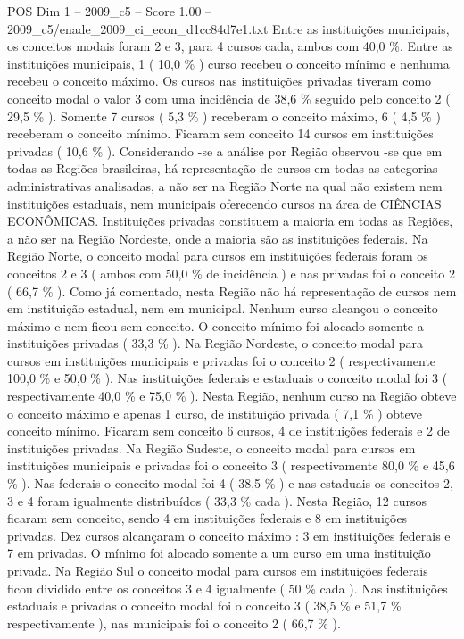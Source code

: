 \begin{textsample}{POS Dim 1 – 2009\_c5 – Score 1.00 – 2009\_c5/enade\_2009\_ci\_econ\_d1cc84d7e1.txt}
Entre as instituições municipais, os conceitos modais foram 2 e 3, para 4 cursos cada, ambos com 40,0 \%.
Entre as instituições municipais, 1 ( 10,0 \% ) curso recebeu o conceito mínimo e nenhuma recebeu o conceito máximo.
Os cursos nas instituições privadas tiveram como conceito modal o valor 3 com uma incidência de 38,6 \% seguido pelo conceito 2 ( 29,5 \% ).
Somente 7 cursos ( 5,3 \% ) receberam o conceito máximo, 6 ( 4,5 \% ) receberam o conceito mínimo.
Ficaram sem conceito 14 cursos em instituições privadas ( 10,6 \% ).
Considerando -se a análise por Região observou -se que em todas as Regiões brasileiras, há representação de cursos em todas as categorias administrativas analisadas, a não ser na Região Norte na qual não existem nem instituições estaduais, nem municipais oferecendo cursos na área de CIÊNCIAS ECONÔMICAS.
Instituições privadas constituem a maioria em todas as Regiões, a não ser na Região Nordeste, onde a maioria são as instituições federais.
Na Região Norte, o conceito modal para cursos em instituições federais foram os conceitos 2 e 3 ( ambos com 50,0 \% de incidência ) e nas privadas foi o conceito 2 ( 66,7 \% ).
Como já comentado, nesta Região não há representação de cursos nem em instituição estadual, nem em municipal.
Nenhum curso alcançou o conceito máximo e nem ficou sem conceito.
O conceito mínimo foi alocado somente a instituições privadas ( 33,3 \% ).
Na Região Nordeste, o conceito modal para cursos em instituições municipais e privadas foi o conceito 2 ( respectivamente 100,0 \% e 50,0 \% ).
Nas instituições federais e estaduais o conceito modal foi 3 ( respectivamente 40,0 \% e 75,0 \% ).
Nesta Região, nenhum curso na Região obteve o conceito máximo e apenas 1 curso, de instituição privada ( 7,1 \% ) obteve conceito mínimo.
Ficaram sem conceito 6 cursos, 4 de instituições federais e 2 de instituições privadas.
Na Região Sudeste, o conceito modal para cursos em instituições municipais e privadas foi o conceito 3 ( respectivamente 80,0 \% e 45,6 \% ).
Nas federais o conceito modal foi 4 ( 38,5 \% ) e nas estaduais os conceitos 2, 3 e 4 foram igualmente distribuídos ( 33,3 \% cada ).
Nesta Região, 12 cursos ficaram sem conceito, sendo 4 em instituições federais e 8 em instituições privadas.
Dez cursos alcançaram o conceito máximo : 3 em instituições federais e 7 em privadas.
O mínimo foi alocado somente a um curso em uma instituição privada.
Na Região Sul o conceito modal para cursos em instituições federais ficou dividido entre os conceitos 3 e 4 igualmente ( 50 \% cada ).
Nas instituições estaduais e privadas o conceito modal foi o conceito 3 ( 38,5 \% e 51,7 \% respectivamente ), nas municipais foi o conceito 2 ( 66,7 \% ).

\end{textsample}
